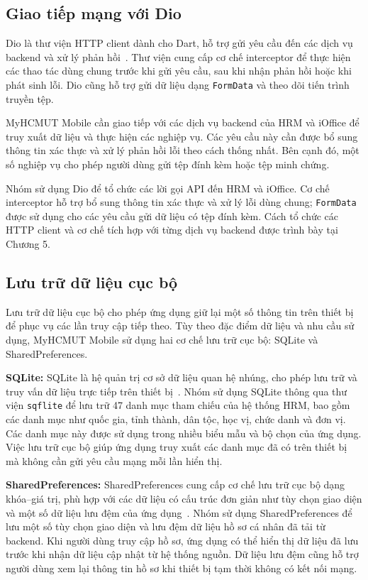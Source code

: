\subsection{Giao tiếp mạng với Dio}
\label{subsec:dio_network}

Dio là thư viện HTTP client dành cho Dart, hỗ trợ gửi yêu cầu đến các dịch vụ backend và xử lý phản hồi~\cite{dio_doc}. Thư viện cung cấp cơ chế interceptor để thực hiện các thao tác dùng chung trước khi gửi yêu cầu, sau khi nhận phản hồi hoặc khi phát sinh lỗi. Dio cũng hỗ trợ gửi dữ liệu dạng \texttt{FormData} và theo dõi tiến trình truyền tệp.

MyHCMUT Mobile cần giao tiếp với các dịch vụ backend của HRM và iOffice để truy xuất dữ liệu và thực hiện các nghiệp vụ. Các yêu cầu này cần được bổ sung thông tin xác thực và xử lý phản hồi lỗi theo cách thống nhất. Bên cạnh đó, một số nghiệp vụ cho phép người dùng gửi tệp đính kèm hoặc tệp minh chứng.

Nhóm sử dụng Dio để tổ chức các lời gọi API đến HRM và iOffice. Cơ chế interceptor hỗ trợ bổ sung thông tin xác thực và xử lý lỗi dùng chung; \texttt{FormData} được sử dụng cho các yêu cầu gửi dữ liệu có tệp đính kèm. Cách tổ chức các HTTP client và cơ chế tích hợp với từng dịch vụ backend được trình bày tại Chương 5.

\subsection{Lưu trữ dữ liệu cục bộ}
\label{subsec:local_storage}

Lưu trữ dữ liệu cục bộ cho phép ứng dụng giữ lại một số thông tin trên thiết bị để phục vụ các lần truy cập tiếp theo. Tùy theo đặc điểm dữ liệu và nhu cầu sử dụng, MyHCMUT Mobile sử dụng hai cơ chế lưu trữ cục bộ: SQLite và SharedPreferences.

\textbf{SQLite:} SQLite là hệ quản trị cơ sở dữ liệu quan hệ nhúng, cho phép lưu trữ và truy vấn dữ liệu trực tiếp trên thiết bị~\cite{sqflite_doc}. Nhóm sử dụng SQLite thông qua thư viện \texttt{sqflite} để lưu trữ 47 danh mục tham chiếu của hệ thống HRM, bao gồm các danh mục như quốc gia, tỉnh thành, dân tộc, học vị, chức danh và đơn vị. Các danh mục này được sử dụng trong nhiều biểu mẫu và bộ chọn của ứng dụng. Việc lưu trữ cục bộ giúp ứng dụng truy xuất các danh mục đã có trên thiết bị mà không cần gửi yêu cầu mạng mỗi lần hiển thị.

\textbf{SharedPreferences:} SharedPreferences cung cấp cơ chế lưu trữ cục bộ dạng khóa--giá trị, phù hợp với các dữ liệu có cấu trúc đơn giản như tùy chọn giao diện và một số dữ liệu lưu đệm của ứng dụng~\cite{shared_preferences_doc}. Nhóm sử dụng SharedPreferences để lưu một số tùy chọn giao diện và lưu đệm dữ liệu hồ sơ cá nhân đã tải từ backend. Khi người dùng truy cập hồ sơ, ứng dụng có thể hiển thị dữ liệu đã lưu trước khi nhận dữ liệu cập nhật từ hệ thống nguồn. Dữ liệu lưu đệm cũng hỗ trợ người dùng xem lại thông tin hồ sơ khi thiết bị tạm thời không có kết nối mạng.


